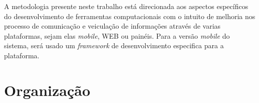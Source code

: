 A metodologia presente neste trabalho está direcionada aos aspectos específicos do desenvolvimento de ferramentas computacionais com o intuito de melhoria nos processo de comunicação e veiculação de informações através de varias plataformas, sejam elas \textit{mobile}, WEB ou painéis. Para a versão \textit{mobile} do sistema, será usado um \textit{framework} de desenvolvimento especifica para a plataforma.

\section{Organização}
